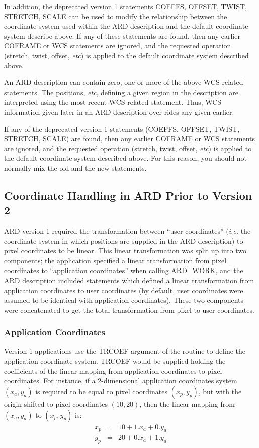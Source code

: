 \begin{enumerate}
In addition, the deprecated version 1 statements COEFFS, OFFSET, TWIST,
STRETCH, SCALE can be used to modify the relationship between the
coordinate system used within the ARD description and the default
coordinate system describe above. If any of these statements are found,
then any earlier COFRAME or WCS statements are ignored, and the requested
operation (stretch, twist, offset, {\em etc}) is applied to the default
coordinate system described above.

\end{enumerate}

An ARD description can contain zero, one or more of the above WCS-related 
statements. The positions, {\em etc}, defining a given region in the
description are interpreted using the most recent WCS-related statement.
Thus, WCS information given later in an ARD description over-rides any
given earlier. 

If any of the deprecated version 1 statements (COEFFS, OFFSET, TWIST,
STRETCH, SCALE) are found, then any earlier COFRAME or WCS statements are 
ignored, and the requested operation (stretch, twist, offset, {\em etc}) is 
applied to the default coordinate system described above. For this
reason, you should not normally mix the old and the new statements.

\subsection{Coordinate Handling in ARD Prior to Version 2}

ARD version 1 required the transformation between ``user coordinates''
({\em i.e.} the coordinate system in which positions are supplied in the
ARD description) to pixel coordinates to be linear. This linear
transformation was split up into two components; the application specified
a linear transformation from pixel coordinates to ``application
coordinates'' when calling ARD\_WORK, and the ARD description included
statements which defined a linear transformation from application
coordinates to user coordinates (by default, user coordinates were
assumed to be identical with application coordinates). These two
components were concatenated to get the total transformation from pixel
to user coordinates.

\subsubsection{Application Coordinates}
Version 1 applications use the TRCOEF argument of the  
routine to define the application coordinate system. TRCOEF would be supplied 
holding the
coefficients of the linear mapping from application coordinates to pixel
coordinates. For instance, if a 2-dimensional application coordinates system
$(x_{a},y_{a})$ is required to be equal to pixel coordinates $(x_{p},y_{p})$,
but with the origin shifted to pixel coordinates $(10,20)$, then the linear
mapping from $(x_{a},y_{a})$ to $(x_{p},y_{p})$ is:
\small
\begin{eqnarray*}
x_{p} & = & 10 + 1.x_{a} + 0.y_{a} \\
y_{p} & = & 20 + 0.x_{a} + 1.y_{a} 
\end{eqnarray*}
\normalsize

